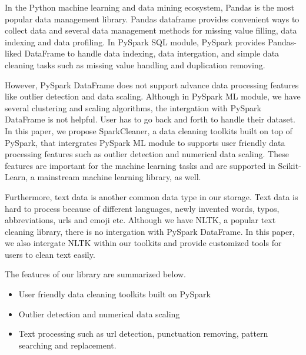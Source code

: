 \documentclass[sigconf]{acmart}
\begin{document}
In the Python machine learning and data mining ecosystem, Pandas\cite{pandas} is the most popular data management library. Pandas dataframe provides convenient ways to collect data and several data management methods for missing value filling, data indexing and data profiling. In PySpark SQL module, PySpark provides Pandas-liked DataFrame to handle data indexing, data intergation, and simple data cleaning tasks such as missing value handling and duplication removing.
	
However, PySpark DataFrame does not support advance data processing features like outlier detection and data scaling. Although in PySpark ML module, we have several clustering and scaling algorithms, the intergation with PySpark DataFrame is not helpful. User has to go back and forth to handle their dataset.  In this paper, we propose SparkCleaner, a data cleaning toolkits built on top of PySpark, that intergrates PySpark ML module to supports user friendly data processing features such as outlier detection and numerical data scaling. These features are important for the machine learning tasks and are supported in Scikit-Learn\cite{scikit-learn}, a mainstream machine learning library, as well.
	
Furthermore, text data is another common data type in our storage. Text data is hard to process because of different languages, newly invented words, typos, abbreviations, urls and emoji etc. Although we have NLTK\cite{nltk}, a popular text cleaning library, there is no intergation with PySpark DataFrame. In this paper, we also intergate NLTK within our toolkits and provide customized tools for users to clean text easily. 
	
The features of our library are summarized below.
\begin{itemize}
	\item{User friendly data cleaning toolkits built on PySpark}
	\item{Outlier detection and numerical data scaling}
	\item{Text processing such as url detection, punctuation removing, pattern searching and replacement. }
\end{itemize}	
\end{document}
